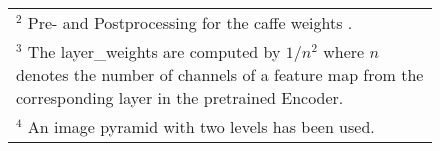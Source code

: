 \begin{figure}[H]
\begin{center}
\begin{rotate}{90}
\begin{tabular}{c|c|c}
			\multicolumn{3}{l}{\scriptsize{$^2$ Pre- and Postprocessing for the caffe weights \cite{SZ2015}.}}\\
			\multicolumn{3}{l}{\scriptsize{$^3$ The layer\_weights are computed by $1/n^2$ where $n$ denotes the number of channels of a feature map from the corresponding layer in the pretrained Encoder.}}\\
			\multicolumn{3}{l}{\scriptsize{$^4$ An image pyramid with two levels has been used.}}\\
		\end{tabular}
\end{rotate}
\label{tab:GEB+2017_parameters}
\end{center}
\end{figure}

